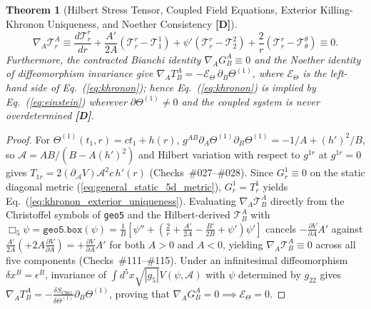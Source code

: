 \documentclass[11pt,a4paper]{article}
\newcommand{\catD}{\textbf{\textcolor{blue!75!black}{[D]}}}
\newtheorem{theorem}{Theorem}[section]
\theoremstyle{definition}
\theoremstyle{remark}
\begin{document}
\begin{theorem}[Hilbert Stress Tensor, Coupled Field Equations, Exterior Killing-Khronon Uniqueness, and Noether Consistency \catD]
\begin{equation}
  \nabla_A\mathcal{T}^A_r \equiv \frac{d\mathcal{T}^r_r}{dr} + \frac{A'}{2 A}\left(\mathcal{T}^r_r - \mathcal{T}^1_1\right) + \psi'\left(\mathcal{T}^r_r - \mathcal{T}^2_2\right) + \frac{2}{r}\left(\mathcal{T}^r_r - \mathcal{T}^{\theta}_{\theta}\right) \equiv 0.
  \label{eq:exact_radial_bianchi}
\end{equation}
Furthermore, the contracted Bianchi identity $\nabla_A G^A_B \equiv 0$ and the Noether identity of diffeomorphism invariance give $\nabla_A T^A_B = -\mathcal{E}_{\Theta}\,\partial_B\Theta^{(1)}$, where $\mathcal{E}_{\Theta}$ is the left-hand side of Eq.~(\ref{eq:khronon}); hence Eq.~(\ref{eq:khronon}) is implied by Eq.~(\ref{eq:einstein}) wherever $\partial\Theta^{(1)} \neq 0$ and the coupled system is never overdetermined \catD.
\end{theorem}

\begin{proof}
For $\Theta^{(1)}(t_1, r) = c t_1 + h(r)$, $g^{AB}\partial_A\Theta^{(1)}\partial_B\Theta^{(1)} = -1/A + (h')^2/B$, so $\mathcal{A} = A B/(B - A(h')^2)$ and Hilbert variation with respect to $g^{1r}$ at $g^{1r}=0$ gives $T_{1r} = 2(\partial_{\mathcal{A}}V)\mathcal{A}^2 c\,h'(r)$ (Checks~\#027--\#028). Since $G^1_r \equiv 0$ on the static diagonal metric (\ref{eq:general_static_5d_metric}), $G^1_r = T^1_r$ yields Eq.~(\ref{eq:khronon_exterior_uniqueness}). Evaluating $\nabla_A\mathcal{T}^A_B$ directly from the Christoffel symbols of \texttt{geo5} and the Hilbert-derived $\mathcal{T}^A_B$ with $\Box_5\psi = \texttt{geo5.box}(\psi) = \frac{1}{B}[\psi'' + (\frac{2}{r} + \frac{A'}{2A} - \frac{B'}{2B} + \psi')\psi']$ cancels $-\frac{\partial V}{\partial A}A'$ against $\frac{A'}{2A}(+2A\frac{\partial V}{\partial A}) = +\frac{\partial V}{\partial A}A'$ for both $A > 0$ and $A < 0$, yielding $\nabla_A\mathcal{T}^A_B \equiv 0$ across all five components (Checks~\#111--\#115). Under an infinitesimal diffeomorphism $\delta x^B = \epsilon^B$, invariance of $\int d^5x\sqrt{|g_5|}V(\psi,\mathcal{A})$ with $\psi$ determined by $g_{22}$ gives $\nabla_A T^A_B = -\frac{\delta S_{\text{CBG}}}{\delta\Theta^{(1)}}\partial_B\Theta^{(1)}$, proving that $\nabla_A G^A_B = 0 \implies \mathcal{E}_{\Theta} = 0$.
\end{proof}
\end{document}
